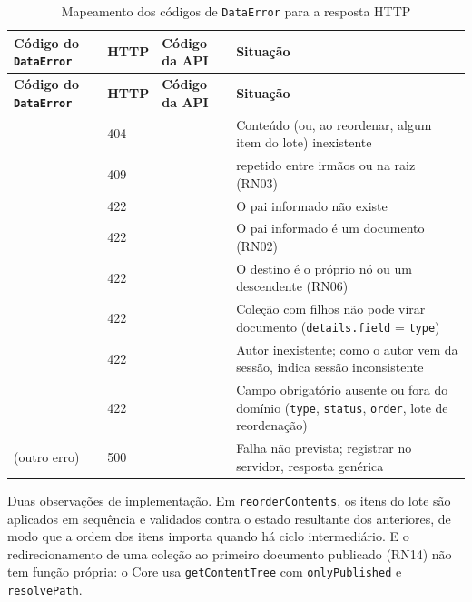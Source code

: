 \begingroup\small
\begin{longtable}{@{}L{3.9cm}L{1.2cm}L{3.3cm}L{5.8cm}@{}}
\caption{Mapeamento dos códigos de \texttt{DataError} para a resposta HTTP}\label{tab:dataerror}\\
\toprule
\textbf{Código do \texttt{DataError}} & \textbf{HTTP} & \textbf{Código da API} & \textbf{Situação}\\
\midrule
\endfirsthead
\toprule
\textbf{Código do \texttt{DataError}} & \textbf{HTTP} & \textbf{Código da API} & \textbf{Situação}\\
\midrule
\endhead
\bottomrule
\endfoot
{} & 404 &  & Conteúdo (ou, ao reordenar, algum item do lote) inexistente\\
\addlinespace
{} & 409 &  &  repetido entre irmãos ou na raiz (RN03)\\
\addlinespace
{} & 422 &  & O pai informado não existe\\
\addlinespace
{} & 422 &  & O pai informado é um documento (RN02)\\
\addlinespace
{} & 422 &  & O destino é o próprio nó ou um descendente (RN06)\\
\addlinespace
{} & 422 &  & Coleção com filhos não pode virar documento (\texttt{details.field} = \texttt{type})\\
\addlinespace
{} & 422 &  & Autor inexistente; como o autor vem da sessão, indica sessão inconsistente\\
\addlinespace
{} & 422 &  & Campo obrigatório ausente ou fora do domínio (\texttt{type}, \texttt{status}, \texttt{order}, lote de reordenação)\\
\addlinespace
(outro erro) & 500 &  & Falha não prevista; registrar no servidor, resposta genérica\\
\end{longtable}
\endgroup

Duas observações de implementação. Em \texttt{reorderContents}, os itens do lote são aplicados em sequência e validados contra o estado resultante dos anteriores, de modo que a ordem dos itens importa quando há ciclo intermediário. E o redirecionamento de uma coleção ao primeiro documento publicado (RN14) não tem função própria: o Core usa \texttt{getContentTree} com \texttt{onlyPublished} e \texttt{resolvePath}.


